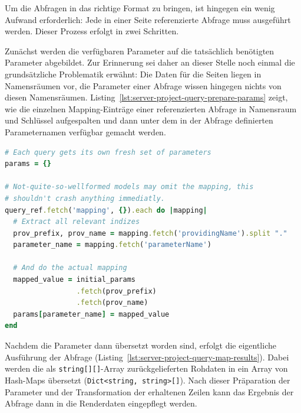 Um die Abfragen in das richtige Format zu bringen, ist hingegen ein wenig Aufwand erforderlich: Jede in einer Seite referenzierte Abfrage muss ausgeführt werden. Dieser Prozess erfolgt in zwei Schritten.

Zunächst werden die verfügbaren Parameter auf die tatsächlich benötigten Parameter abgebildet. Zur Erinnerung sei daher an dieser Stelle noch einmal die grundsätzliche Problematik erwähnt: Die Daten für die Seiten liegen in Namensräumen vor, die Parameter einer Abfrage wissen hingegen nichts von diesen Namensräumen. Listing~\ref{lst:server-project-query-prepare-params} zeigt, wie die einzelnen Mapping-Einträge einer referenzierten Abfrage in Namensraum und Schlüssel aufgespalten und dann unter dem in der Abfrage definierten Parameternamen verfügbar gemacht werden.

\begin{lstlisting}[float=p, language=Ruby, caption={Renderdaten einer Abfrage (1): Parameter binden}, label={lst:server-project-query-prepare-params}]
# Each query gets its own fresh set of parameters
params = {}

# Not-quite-so-wellformed models may omit the mapping, this
# shouldn't crash anything immediatly.
query_ref.fetch('mapping', {}).each do |mapping|
  # Extract all relevant indizes
  prov_prefix, prov_name = mapping.fetch('providingName').split "."
  parameter_name = mapping.fetch('parameterName')
  
  # And do the actual mapping
  mapped_value = initial_params
                 .fetch(prov_prefix)
                 .fetch(prov_name)
  params[parameter_name] = mapped_value
end
\end{lstlisting}

Nachdem die Parameter dann übersetzt worden sind, erfolgt die eigentliche Ausführung der Abfrage (Listing~\ref{lst:server-project-query-map-results}). Dabei werden die als \texttt{string[][]}-Array zurückgelieferten Rohdaten in ein Array von Hash-Maps übersetzt (\texttt{Dict<string, string>[]}). Nach dieser Präparation der Parameter und der Transformation der erhaltenen Zeilen kann das Ergebnis der Abfrage dann in die Renderdaten eingepflegt werden.

